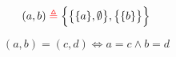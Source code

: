 \begin{frame}{}
  \begin{definition}
    \[
      (a, b) \;\textcolor{red}{\triangleq}\; \Big\{\big\{\{a\}, \emptyset\big\}, \big\{\{b\}\big\}\Big\}
    \]
  \end{definition}


  \pause
  \begin{theorem}
    \[
      (a, b) = (c, d) \iff a = c \land b = d
    \]
  \end{theorem}
\end{frame}
